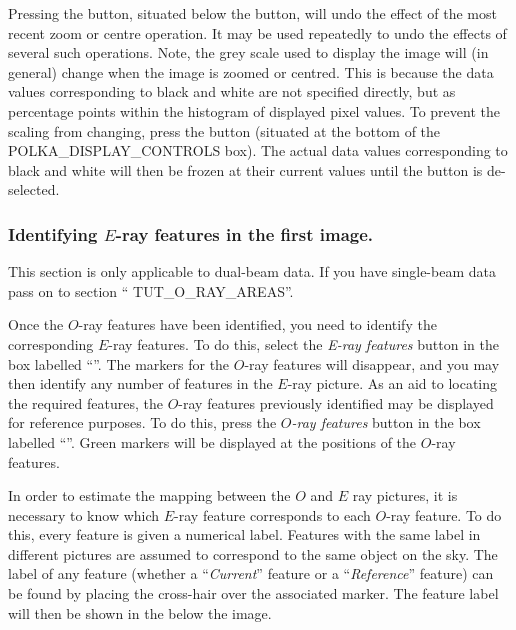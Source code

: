 \documentclass[11pt,nolof]{starlink}
\begin{document}
Pressing the  button, situated below
the  button, will undo the effect of the
most recent zoom or centre operation. It may be used repeatedly to undo
the effects of several such operations. Note, the grey scale used to
display the image will (in general) change when the image is zoomed or
centred. This is because the data values corresponding to black and
white are not specified directly, but as percentage points within the
histogram of displayed pixel values. To prevent the scaling from
changing, press the 
button (situated at the bottom of the 
{POLKA_DISPLAY_CONTROLS} box). The actual data values corresponding to
black and white will then be frozen at their current values until the
button is de-selected.

\subsubsection {Identifying $E$-ray features in the first image.}
This section is only applicable to dual-beam data. If you have
single-beam data pass on to section ``
{TUT_O_RAY_AREAS}''.

Once the $O$-ray features have been identified, you need to identify the
corresponding $E$-ray features. To do this, select the \emph{E-ray
features} button in the box labelled ``''. The markers for the $O$-ray features will
disappear, and you may then identify any number of features in the
$E$-ray picture. As an aid to locating the required features, the $O$-ray
features previously identified may be displayed for reference purposes. To
do this, press the \emph{$O$-ray features} button in the box labelled
``''. Green markers will be
displayed at the positions of the $O$-ray features.

In order to estimate the mapping between the $O$ and $E$ ray pictures, it
is necessary to know which $E$-ray feature corresponds to each $O$-ray
feature. To do this, every feature is given a numerical label. Features
with the same label in different pictures are assumed to correspond to
the same object on the sky. The label of any feature (whether a ``\emph{Current}'' feature or a ``\emph{Reference}'' feature) can be found by
placing the cross-hair over the associated marker. The feature label
will then be shown in the  below
the image.
\end{document}
